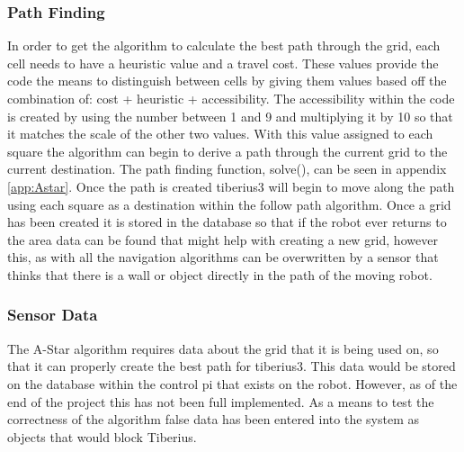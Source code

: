 \subsubsection{Path Finding}
In order to get the algorithm to calculate the best path through the grid, each cell needs to have a heuristic value and a travel cost. These values provide the code the means to distinguish between cells by giving them values based off the combination of: cost + heuristic + accessibility. The accessibility within the code is created by using the number between 1 and 9 and multiplying it by 10 so that it matches the scale of the other two values. With this value assigned to each square the algorithm can begin to derive a path through the current grid to the current destination. The path finding function, solve(), can be seen in appendix \ref{app:Astar}. Once the path is created \gls{tiberius3} will begin to move along the path using each square as a destination within the follow path algorithm. Once a grid has been created it is stored in the database so that if the robot ever returns to the area data can be found that might help with creating a new grid, however this, as with all the navigation algorithms can be overwritten by a sensor that thinks that there is a wall or object directly in the path of the moving robot.
\subsubsection{Sensor Data}
The A-Star algorithm requires data about the grid that it is being used on, so that it can properly create the best path for \gls{tiberius3}. This data would be stored on the database within the control pi that exists on the robot. However, as of the end of the project this has not been full implemented. As a means to test the correctness of the algorithm false data has been entered into the system as objects that would block Tiberius.






















